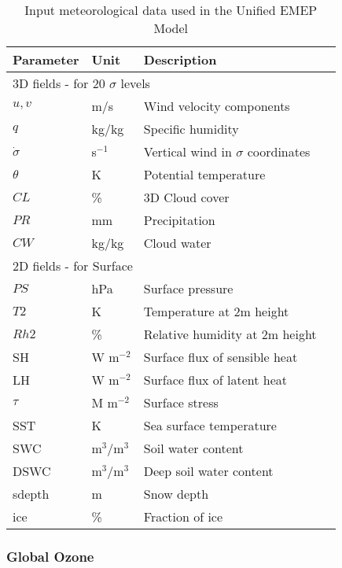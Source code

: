 \begin{table}[hb]
\caption{Input meteorological data used in the Unified EMEP Model
   \label{Tab:metinput}}
\begin{tabular}{p{6cm}lll}
\hline
Parameter      & Unit & Description          \\
\hline
\multicolumn{3}{l}{3D fields - for 20 $\sigma$ levels} \\
$u,v$  &  m/s     & Wind velocity components   \\
$q$    &  kg/kg   & Specific humidity           \\
$\dot{\sigma}$ & s$^{-1}$ & Vertical wind in $\sigma$ coordinates \\
$\theta$       & K  & Potential temperature \\
$CL$             & \% & 3D Cloud cover            \\
$PR$             & mm & Precipitation         \\
$CW$             & kg/kg & Cloud water          \\
\hline
\multicolumn{3}{l}{2D fields - for Surface} \\
$PS$             & hPa & Surface pressure                     \\
$T2$          & K  & Temperature at 2m height               \\
$Rh2$             & \% & Relative humidity at 2m height \\
SH              & W m$^{-2}$ & Surface flux of sensible heat \\
LH             & W m$^{-2}$ & Surface flux of latent heat \\
$\tau$         & M m$^{-2}$ & Surface stress               \\
SST            & K & Sea surface temperature \\
SWC            & m$^3$/m$^{3}$ & Soil water content        \\
DSWC           & m$^3$/m$^{3}$ & Deep soil water content   \\
sdepth         & m & Snow depth \\
ice            & \% & Fraction of ice \\  
\hline
\end{tabular}
\end{table}



\subsubsection{Global Ozone}

